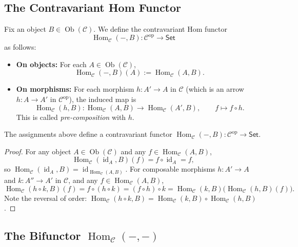 \subsection{The Contravariant Hom Functor}

Fix an object $B \in \operatorname{Ob}(\mathcal{C})$. We define the contravariant Hom functor
\[
\operatorname{Hom}_{\mathcal{C}}(-, B): \mathcal{C}^{\mathrm{op}} \longrightarrow \mathsf{Set}
\]
as follows:
\begin{itemize}
    \item \textbf{On objects:} For each $A \in \operatorname{Ob}(\mathcal{C})$, 
    \[
    \operatorname{Hom}_{\mathcal{C}}(-, B)(A) := \operatorname{Hom}_{\mathcal{C}}(A, B).
    \]
    \item \textbf{On morphisms:} For each morphism $h: A' \to A$ in $\mathcal{C}$ (which is an arrow $h: A \to A'$ in $\mathcal{C}^{\mathrm{op}}$), the induced map is
    \[
    \operatorname{Hom}_{\mathcal{C}}(h, B): \operatorname{Hom}_{\mathcal{C}}(A, B) \longrightarrow \operatorname{Hom}_{\mathcal{C}}(A', B), \qquad f \longmapsto f \circ h.
    \]
    This is called \emph{pre-composition} with $h$.
\end{itemize}

\begin{prop}
The assignments above define a contravariant functor $\operatorname{Hom}_{\mathcal{C}}(-, B): \mathcal{C}^{\mathrm{op}} \to \mathsf{Set}$.
\end{prop}

\begin{proof}
For any object $A \in \operatorname{Ob}(\mathcal{C})$ and any $f \in \operatorname{Hom}_{\mathcal{C}}(A, B)$,
\[
\operatorname{Hom}_{\mathcal{C}}(\operatorname{id}_A, B)(f) = f \circ \operatorname{id}_A = f,
\]
so $\operatorname{Hom}_{\mathcal{C}}(\operatorname{id}_A, B) = \operatorname{id}_{\operatorname{Hom}_{\mathcal{C}}(A, B)}$. For composable morphisms $h: A' \to A$ and $k: A'' \to A'$ in $\mathcal{C}$, and any $f \in \operatorname{Hom}_{\mathcal{C}}(A, B)$,
\[
\operatorname{Hom}_{\mathcal{C}}(h \circ k, B)(f) = f \circ (h \circ k) = (f \circ h) \circ k = \operatorname{Hom}_{\mathcal{C}}(k, B)\big(\operatorname{Hom}_{\mathcal{C}}(h, B)(f)\big).
\]
Note the reversal of order: $\operatorname{Hom}_{\mathcal{C}}(h \circ k, B) = \operatorname{Hom}_{\mathcal{C}}(k, B) \circ \operatorname{Hom}_{\mathcal{C}}(h, B)$.
\end{proof}

\subsection{The Bifunctor $\operatorname{Hom}_{\mathcal{C}}(-, -)$}

